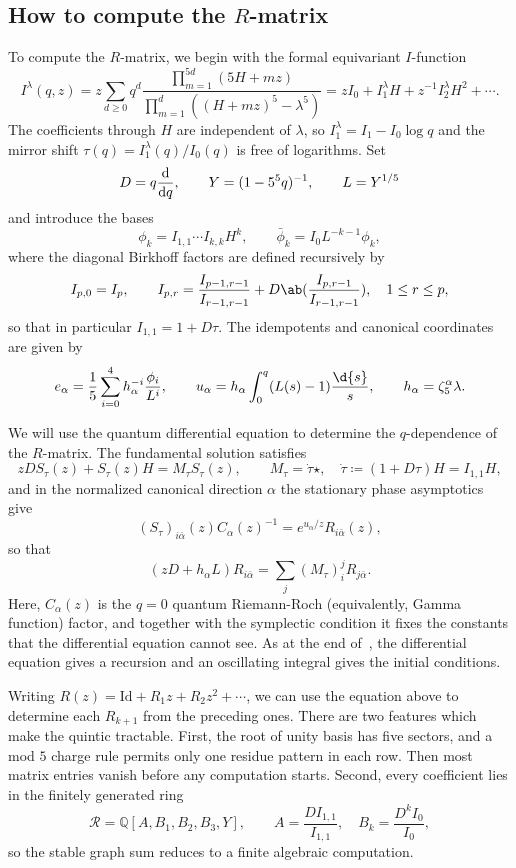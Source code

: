 \documentclass{amsart}
\theoremstyle{definition}
\theoremstyle{remark}
\theoremstyle{plain}
\theoremstyle{definition}
\theoremstyle{remark}
\newcommand{\Q}{\mathbb{Q}}
\newcommand{\mc}[1]{\mathcal{#1}}
\newcommand{\mr}[1]{\mathrm{#1}}
\newcommand{\1}{\mathbf{1}}
\newcommand{\2}{\mathbf{2}}
\newcommand{\3}{\mathbf{3}}
\begin{document}
\subsection{How to compute the \(R\)-matrix}%
\label{sub:How to compute the R-matrix (Guo)}

To compute the \(R\)-matrix, we begin with the formal equivariant \(I\)-function
\[ I^{\lambda}(q,z) = z\sum_{d\geq0}q^d \frac{\prod_{m=1}^{5d}(5H+mz)}{\prod_{m=1}^d ((H+mz)^5 - \lambda^5)} = zI_0 + I_1^{\lambda}H + z^{-1}I_2^{\lambda}H^2 + \cdots. \]
The coefficients through \(H\) are independent of \(\lambda\), so \(I_1^{\lambda} = I_1 - I_0 \log q\) and the mirror shift \(\tau(q) = I_1^{\lambda}(q)/I_0(q)\) is free of logarithms. Set
\[ D = q\odv{}{q}, \qquad Y = (1-5^5q)^{-1}, \qquad L = Y^{1/5} \]
and introduce the bases
\[ \phi_k = I_{1,1}\cdots I_{k,k}H^k, \qquad \bar{\phi}_k = I_0 L^{-k-1}\phi_k, \]
where the diagonal Birkhoff factors are defined recursively by
\[ I_{p,0} = I_p, \qquad I_{p,r} = \frac{I_{p-1,r-1}}{I_{r-1,r-1}} + D \ab( \frac{I_{p,r-1}}{I_{r-1,r-1}}), \quad 1 \leq r \leq p, \]
so that in particular \(I_{1,1} = 1+D\tau\). The idempotents and canonical coordinates are given by
\[ e_{\alpha} = \frac{1}{5}\sum_{i=0}^4 h_{\alpha}^{-i}\frac{\phi_i}{L^i}, \qquad u_{\alpha} = h_{\alpha}\int_0^q (L(s)-1)\frac{\d{s}}{s}, \qquad h_{\alpha} = \zeta_5^{\alpha}\lambda. \]

We will use the quantum differential equation to determine the \(q\)-dependence of the \(R\)-matrix. The fundamental solution satisfies
\[ zDS_{\tau}(z) + S_{\tau}(z)H = M_{\tau}S_{\tau}(z), \qquad M_{\tau} = \dot{\tau}\star, \quad \dot{\tau} \coloneqq (1+D\tau)H = I_{1,1}H, \]
and in the normalized canonical direction \(\alpha\) the stationary phase asymptotics give
\[ (S_{\tau})_{i\bar{\alpha}}(z)C_{\alpha}(z)^{-1} = e^{u_{\alpha}/z}R_{i\bar{\alpha}}(z), \]
so that
\[ (zD+h_{\alpha}L)R_{i\bar{\alpha}} = \sum_j (M_{\tau})_i^j R_{j\bar{\alpha}}. \]
Here, \(C_{\alpha}(z)\) is the \(q=0\) quantum Riemann-Roch (equivalently, Gamma function) factor, and together with the symplectic condition it fixes the constants that the differential equation cannot see. As at the end of~, the differential equation gives a recursion and an oscillating integral gives the initial conditions.

Writing \(R(z) = \mr{Id} + R_1 z + R_2 z^2 + \cdots\), we can use the equation above to determine each \(R_{k+1}\) from the preceding ones. There are two features which make the quintic tractable. First, the root of unity basis has five sectors, and a mod \(5\) charge rule permits only one residue pattern in each row. Then most matrix entries vanish before any computation starts. Second, every coefficient lies in the finitely generated ring
\[ \mc{R} = \Q[A,B_1,B_2,B_3,Y], \qquad A = \frac{DI_{1,1}}{I_{1,1}}, \quad B_k = \frac{D^k I_0}{I_0}, \]
so the stable graph sum reduces to a finite algebraic computation.
\end{document}
